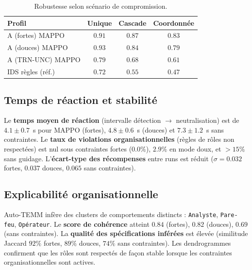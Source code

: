 \begin{table}[h!]
  \centering
  \caption{Robustesse selon scénario de compromission.}
  \label{tab:drone_robustness}
  \renewcommand{\arraystretch}{1.2}
  \small
  \begin{tabular}{|l|c|c|c|}
    \hline
    \textbf{Profil}   & \textbf{Unique} & \textbf{Cascade} & \textbf{Coordonnée} \\
    \hline
    A (fortes) MAPPO  & $0.91$          & $\mathbf{0.87}$  & $\mathbf{0.83}$     \\
    A (douces) MAPPO  & $\mathbf{0.93}$ & $0.84$           & $0.79$              \\
    A (TRN-UNC) MAPPO & $0.79$          & $0.68$           & $0.61$              \\
    IDS règles (réf.) & $0.72$          & $0.55$           & $0.47$              \\
    \hline
  \end{tabular}
\end{table}

\subsection*{Temps de réaction et stabilité}

Le \textbf{temps moyen de réaction} (intervalle détection $\rightarrow$ neutralisation) est de $4.1 \pm 0.7$~s pour MAPPO (fortes), $4.8 \pm 0.6$~s (douces) et $7.3 \pm 1.2$~s sans contraintes.
Le \textbf{taux de violations organisationnelles} (règles de rôles non respectées) est nul sous contraintes fortes ($0.0\%$), $2.9\%$ en mode doux, et $>15\%$ sans guidage.
L’\textbf{écart-type des récompenses} entre runs est réduit ($\sigma=0.032$ fortes, $0.037$ douces, $0.065$ sans contraintes).

\subsection*{Explicabilité organisationnelle}

Auto-TEMM infère des clusters de comportements distincts : \texttt{Analyste}, \texttt{Pare-feu}, \texttt{Opérateur}.
Le \textbf{score de cohérence} atteint $0.84$ (fortes), $0.82$ (douces), $0.69$ (sans contraintes).
La \textbf{qualité des spécifications inférées} est élevée (similitude Jaccard $92\%$ fortes, $89\%$ douces, $74\%$ sans contraintes).
Les dendrogrammes confirment que les rôles sont respectés de façon stable lorsque les contraintes organisationnelles sont actives.

